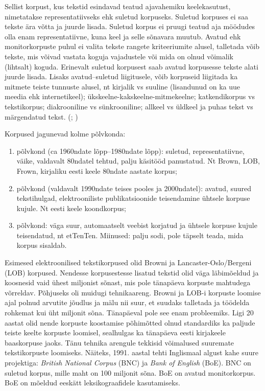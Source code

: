 \documentclass[12pt]{article}
\begin{document}
Sellist korpust, kus tekstid esindavad teatud ajavahemiku keelekasutust, nimetatakse representatiivseks ehk suletud korpuseks. Suletud korpuses ei saa tekste ära võtta ja juurde lisada. Suletud korpus ei pruugi teatud aja möödudes olla enam representatiivne, kuna keel ja selle sõnavara muutub. Avatud ehk monitorkorpuste puhul ei valita tekste rangete kriteeriumite alusel, talletada võib tekste, mis võivad vastata koguja vajadustele või mida on olnud võimalik (lihtsalt) koguda. Erinevalt suletud korpusest saab avatud korpusesse tekste alati juurde lisada. Lisaks avatud--suletud liigitusele, võib korpuseid liigitada ka mitmete teiste tunnuste alusel, nt kirjalik vs suuline (lisandunud on ka uue meedia ehk internetikeel); ükskeelne-kakskeelne-mitmekeelne; katkendikorpus vs tekstikorpus; diakrooniline vs sünkrooniline; allkeel vs üldkeel ja puhas tekst vs märgendatud tekst. (\citealp[9--11]{KR}; \citealp[9--13]{KORPUS})

Korpused jagunevad kolme põlvkonda:
\begin{enumerate}
\item põlvkond (ca 1960ndate lõpp--1980ndate lõpp): suletud, representatiivne, väike, valdavalt 80ndatel
tehtud, palju käsitööd panustatud. Nt Brown, LOB, Frown, kirjaliku eesti keele 80ndate aastate korpus;
\item põlvkond (valdavalt 1990ndate teises pooles ja 2000ndatel): avatud, suured tekstihulgad,
elektrooniliste publikatsioonide teisendamine ühtsele korpuse kujule. Nt eesti keele koondkorpus;
\item põlvkond: väga suur, automaatselt veebist korjatud ja ühtsele korpuse kujule teisendatud, nt etTenTen. Miinused: palju sodi, pole täpselt teada, mida korpus sisaldab. \citep[37--38]{M_OK2015}
\end{enumerate}

Esimesed elektroonilised tekstikorpused olid Browni ja Lancaster-Oslo/Bergeni (LOB) korpused. Nendesse korpusestesse lisatud tekstid olid väga läbimõeldud ja koosnesid vaid ühest miljonist sõnast, mis pole tänapäeva korpuste mahtudega võrreldav. Põhjuseks oli muidugi tehnikaareng. Browni ja LOB-i korpuste loomise ajal polnud arvutite jõudlus ja mälu nii suur, et suudaks talletada ja töödelda rohkemat kui üht miljonit sõna.
Tänapäeval pole see enam probleemiks. Ligi 20 aastat olid nende korpuste koostamise põhimõtted olnud standardiks ka paljude teiste keelte korpuste loomisel, sealhulgas ka tänapäeva eesti kirjakeele baaskorpuse jaoks. Tänu tehnika arengule tekkisid võimalused
suuremate tekstikorpuste loomiseks. Näiteks, 1991. aastal tehti Inglismaal algust kahe suure projektiga: \emph{British National Corpus} (BNC) ja \emph{Bank of English} (BoE). BNC on suletud korpus, mille maht on 100 miljonit sõna. BoE on avatud monitorkorpus. BoE on mõeldud eeskätt leksikograafidele kasutamiseks.
 \citep[9--11]{KR}
\end{document}
